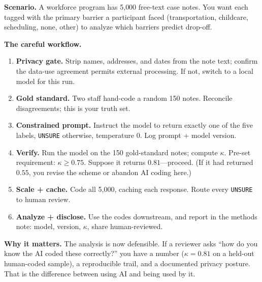 \documentclass[
    a4paper,
    fontsize=10pt,
    twoside=true,
    numbers=noenddot,
]{kaobook}
\newcounter{appliedexample}
\newenvironment{appliedexample}[1][]{%
    \refstepcounter{appliedexample}%
    \begin{appliedexamplebox}[frametitle={Applied Example~\theappliedexample.~~#1}]%
}{%
    \end{appliedexamplebox}%
}
\begin{document}
\begin{appliedexample}[Coding 5,000 Progress Notes Without Getting Burned]
\textbf{Scenario.} A workforce program has 5{,}000 free-text case notes. You want each tagged with the primary barrier a participant faced (transportation, childcare, scheduling, none, other) to analyze which barriers predict drop-off.

\medskip
\textbf{The careful workflow.}
\begin{enumerate}
    \item \textbf{Privacy gate.} Strip names, addresses, and dates from the note text; confirm the data-use agreement permits external processing. If not, switch to a local model for this run.
    \item \textbf{Gold standard.} Two staff hand-code a random 150 notes. Reconcile disagreements; this is your truth set.
    \item \textbf{Constrained prompt.} Instruct the model to return exactly one of the five labels, \texttt{UNSURE} otherwise, temperature 0. Log prompt + model version.
    \item \textbf{Verify.} Run the model on the 150 gold-standard notes; compute $\kappa$. Pre-set requirement: $\kappa \geq 0.75$. Suppose it returns $0.81$---proceed. (If it had returned $0.55$, you revise the scheme or abandon AI coding here.)
    \item \textbf{Scale + cache.} Code all 5{,}000, caching each response. Route every \texttt{UNSURE} to human review.
    \item \textbf{Analyze + disclose.} Use the codes downstream, and report in the methods note: model, version, $\kappa$, share human-reviewed.
\end{enumerate}

\medskip
\textbf{Why it matters.} The analysis is now defensible. If a reviewer asks \enquote{how do you know the AI coded these correctly?} you have a number ($\kappa = 0.81$ on a held-out human-coded sample), a reproducible trail, and a documented privacy posture. That is the difference between using AI and being used by it.
\end{appliedexample}


\end{document}
